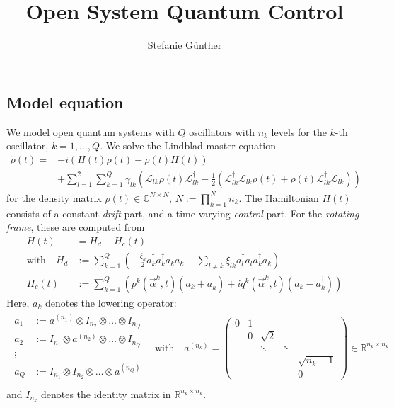 \documentclass[letterpaper]{article}
\title{Open System Quantum Control}
\author{Stefanie G{\"u}nther}
\newcommand{\Ell}{\mathcal{L}}
\newcommand{\R}{\mathds{R}}
\newcommand{\C}{\mathds{C}}
\begin{document}
\maketitle

\subsection*{Model equation}
We model open quantum systems with $Q$ oscillators with $n_k$ levels for the $k$-th oscillator, $k=1,\dots,Q$. We solve the Lindblad master equation
\begin{align}\label{mastereq}
  \dot \rho(t) = &-i(H(t)\rho(t) - \rho(t)H(t)) \\
          &+ \sum_{l=1}^2 \sum_{k=1}^Q \gamma_{lk} \left( \Ell_{lk} \rho(t) \Ell_{lk}^{\dagger} - \frac 1 2 \left( \Ell_{lk}^{\dagger}\Ell_{lk} \rho(t) + \rho(t)\Ell_{lk}^{\dagger} \Ell_{lk}\right) \right)
\end{align}
for the density matrix $\rho(t)\in \C^{N\times N}$, $N := \prod_{k=1}^N n_k$. The Hamiltonian $H(t)$ consists of a constant \textit{drift} part, and a time-varying \textit{control} part. For the \textit{rotating frame}, these are computed from
\begin{align}
  H(t) &= H_d + H_c(t) \\
  \text{with} \quad H_d &:= \sum_{k=1}^Q \left(- \frac{\xi_k}{2} a_k^{\dagger}a_k^{\dagger}a_k a_k - \sum_{l\neq k} \xi_{lk} a_l^{\dagger}a_l a_k^{\dagger} a_k  \right) \\
                 H_c(t) &:= \sum_{k=1}^Q \left( p^k(\vec{\alpha}^k,t) (a_k + a_k^{\dagger}) + i q^k(\vec{\alpha}^k,t)(a_k - a_k^{\dagger})  \right)
\end{align}
Here, $a_k$ denotes the lowering operator:
\begin{align}
  \begin{array}{rl}
  a_1 &:= a^{(n_1)} \otimes I_{n_2} \otimes \dots \otimes I_{n_Q}\\
  a_2 &:= I_{n_1} \otimes a^{(n_2)} \otimes \dots \otimes I_{n_Q}\\
  \vdots \, & \\
  a_Q &:= I_{n_1} \otimes I_{n_2} \otimes \dots \otimes a^{(n_Q)}\\
  \end{array}
  \quad \text{with}\quad
 a^{(n_k)} = \begin{pmatrix}
   0 & 1 &          &         &    \\
     & 0 & \sqrt{2} &         &     \\
     &   & \ddots   & \ddots  &    \\
     &   &          &         & \sqrt{n_k-1}  \\
     &   &          &         & 0   
 \end{pmatrix} \in \R^{n_k \times n_k}
\end{align}
and $I_{n_k}$ denotes the identity matrix in $\R^{n_k \times n_k}$.
\end{document}
